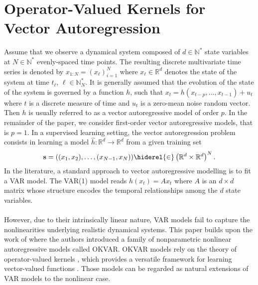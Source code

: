\section{Operator-Valued Kernels for Vector Autoregression}
Assume that we observe a dynamical system composed of $d\in\mathbb{N}^*$ state
variables at $N\in\mathbb{N}^*$ evenly-spaced time points. The resulting
discrete multivariate time series is denoted by $x_{1:N}=(x_\ell)_{i=1}^N$
where $x_\ell\in\mathbb{R}^d$ denotes the state of the system at time
$t_\ell$, $\ell\in\mathbb{N}_N^*$. It is generally assumed that the evolution
of the state of the system is governed by a function $h$, such that
$x_{t}=h(x_{t-p},\dots,x_{t-1}) + u_{t}$ where $t$ is a discrete
measure of time and $u_t$ is a zero-mean noise random vector. %
Then $h$ is usually referred to as a vector autoregressive model of order $p$.
In the remainder of the paper, we consider first-order vector autoregressive
models, that is $p=1$. In a supervised learning setting, the vector
autoregression problem consists in learning a model $\hat{h}:\mathbb{R}^d \to
\mathbb{R}^d$ from a given training set 
\begin{dmath*}
    \seq{s} = ((x_{1},x_{2}),\dots,(x_{N-1},x_{N}))\hiderel{\in}
    \left(\mathbb{R}^d\times\mathbb{R}^d\right)^N.
\end{dmath*}
In the literature, a standard approach to vector autoregressive modelling is to
fit a \ac{VAR} model. The \ac{VAR}(1) model reads $h(x_t) = Ax_t$ where $A$
is an $d\times d$ matrix whose structure encodes the temporal relationships
among the $d$ state variables.
\paragraph{}
However, due to their intrinsically linear nature, \acs{VAR} models fail to
capture the nonlinearities underlying realistic dynamical systems. This paper
builds upon the work of \citet{Lim2015} where the authors introduced a
family of nonparametric nonlinear autoregressive models called \ac{OKVAR}.
\ac{OKVAR} models rely on the theory of operator-valued kernels
\cite{Pedrick57, Senkene73}, which provides a versatile framework for learning
vector-valued functions \citep{Micchelli2005,Carmeli2010,Alvarez2012}. Those
models can be regarded as natural extensions of VAR models to the nonlinear
case.
